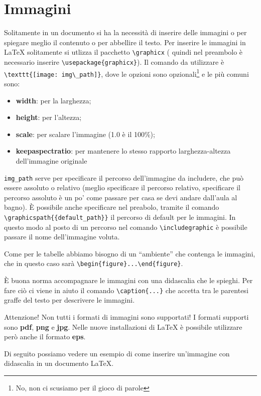 \section{Immagini}
Solitamente in un documento si ha la necessità di inserire delle immagini o 
per spiegare meglio il contenuto o per abbellire il testo. Per inserire le 
immagini in \LaTeX{} solitamente si utlizza il pacchetto \verb!\graphicx! (
quindi nel preambolo è necessario inserire \verb!\usepackage{graphicx}!). Il 
comando da utilizzare è \verb!\texttt{[image: img\_path]}!, dove le 
opzioni sono opzionali\footnote{No, non ci scusiamo per il gioco di parole} e 
le più comuni sono:
\begin{itemize}
    \item \textbf{width}: per la larghezza;
    \item \textbf{height}: per l'altezza;
    \item \textbf{scale}: per scalare l'immagine (1.0 è il 100\%);
    \item \textbf{keepaspectratio}: per mantenere lo stesso rapporto 
    larghezza-altezza dell’immagine originale
\end{itemize}
\verb!img_path! serve per specificare il percorso dell'immagine da includere, 
che può essere assoluto o relativo (meglio specificare il percorso relativo, 
specificare il percorso assoluto è un po' come passare per casa se devi andare 
dall'aula al bagno). È possibile anche specificare nel preabolo, tramite il 
comando \verb!\graphicspath{{default_path}}! il percorso di default per le 
immagini. In questo modo al posto di un percorso nel comando 
\verb!\includegraphic! è possibile passare il nome dell'immagine voluta.

Come per le tabelle abbiamo bisogno di un ``ambiente'' che contenga le 
immagini, che in questo caso sarà \verb!\begin{figure}...\end{figure}!.

È buona norma accompagnare le immagini con una didascalia che le spieghi. Per 
fare ciò ci viene in aiuto il comando \verb!\caption{...}! che accetta tra le 
parentesi graffe del testo per descrivere le immagini.

Attenzione! Non tutti i formati di immagini sono supportati! I formati 
supporti sono \textbf{pdf}, \textbf{png} e \textbf{jpg}. Nelle nuove 
installazioni di \LaTeX{} è possibile utilizzare però anche il formato \textbf{
eps}.

Di seguito possiamo vedere un esempio di come inserire un'immagine con 
didascalia in un documento \LaTeX{}.




